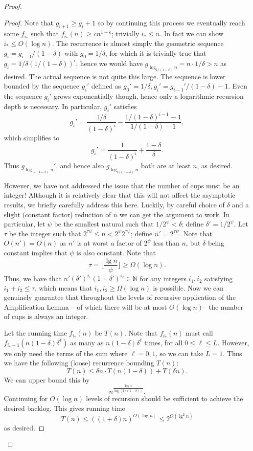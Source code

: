 \documentclass[twocolumn]{article}[10pt]
\begin{document}
\begin{proof}
\begin{proof}
  Note that $g_{i+1} \ge g_i + 1$ so by continuing this process we eventually
  reach some $f_{i_*}$ such that $f_{i_*}(n) \ge cn^{1-\epsilon}$; trivially
  $i_* \le n$. In fact we can show $i_* \le O(\log n)$. The recurrence is
  almost simply the geometric sequence $g_i = g_{i-1}/(1-\delta)$ with
  $g_0=1/\delta$, for which it is trivially true that $g_i = 1/\delta
  (1/(1-\delta))^i$, hence we would have $g_{\log_{1/(1-\delta)} n} = n\cdot 1/\delta > n$ as
  desired. The actual sequence is not quite this large. The sequence is lower
  bounded by the sequence $g_i'$ defined as $g_0'=1/\delta, g_i' = g_{i-1}' /
  (1-\delta) -1$. Even the sequence $g_i'$ grows exponentially though, hence
  only a logarithmic recursion depth is necessary. In particular, $g_i'$ satisfies
  $$g_i' = \frac{1/\delta}{(1-\delta)^i} - \frac{1/(1-\delta)^{i-1}-1}{1/(1-\delta)-1},$$
  which simplifies to
  $$g_i' = \frac{1}{(1-\delta)^i} + \frac{1-\delta}{\delta}.$$
  Thus $g_{\log_{1/(1-\delta)} n}'$, and hence also $g_{\log_{1/(1-\delta)} n}$
  both are at least $n$, as desired.

  However, we have not addressed the issue that the number of cups must be an
  integer! Although it is relatively clear that this will not affect the
  asymptotic results, we briefly carefully address this here. Luckily, by
  careful choice of $\delta$ and a slight (constant factor) reduction of $n$ we can get the
  argument to work. In particular, let $\psi$ be the smallest natural such that
  $1/2^\psi < \delta$; define $\delta' = 1/2^\psi$. Let $\tau$ be the integer
  such that $2^{\tau \psi} \le n < 2^\psi 2^{\tau \psi}$; define $n' =
  2^{\tau\psi}$. Note that $O(n') = O(n)$ as $n'$ is at worst a factor of
  $2^\psi$ less than $n$, but $\delta$ being constant implies that $\psi$ is
  also constant. Note that $$\tau = \Big\lfloor \frac{\lg n}{\psi} \Big\rfloor \ge \Omega(\log n).$$
  Thus, we have that $n'(\delta')^{i_1}(1-\delta')^{i_2} \in \mathbb{N}$ for any
  integers $i_1,i_2$ satisfying $i_1+i_2 \le \tau$, which means that $i_1,i_2\ge \Omega(\log n)$ is possible.
  Now we can genuinely guarantee that throughout the levels of recursive application of
  the Amplification Lemma -- of which there will be at most $O(\log n)$-- the
  number of cups is always an integer. 

  Let the running time $f_{i_*}(n)$ be $T(n)$.
  Note that $f_{i_*}(n)$ must call $f_{i_*-1}(n(1-\delta)\delta^\ell)$ as many
  as $n(1-\delta)\delta^\ell$ times, for all $0 \le \ell\le L$. However, we
  only need the terms of the sum where $\ell=0,1$, so we can take $L=1$.
  Thus we have the following (loose) recurrence bounding $T(n)$:
  $$T(n) \le \delta n \cdot T(n(1-\delta)) + T(\delta n).$$
  We can upper bound this by
  $$n^{\frac{\log n}{\log (1/(1-\delta))}}.$$
  Continuing for $O(\log n)$ levels of recursion should be sufficient to
  achieve the desired backlog. This gives running time
  $$T(n) \le ((1+\delta) n)^{O(\log n)} \le 2^{O(\lg^2 n)}$$
  as desired.
    

\end{proof}
\end{proof}
\end{document}
